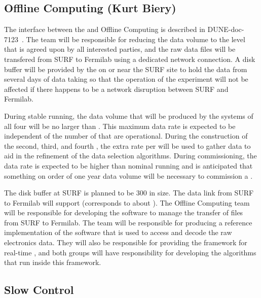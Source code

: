 \subsection{Offline Computing (Kurt Biery)}
\label{sec:fd-daq-intfc-fnal-cmptg}

The interface between the  and Offline Computing is
described in DUNE-doc-7123~\cite{docdb-7123}.
The  team will be responsible for reducing the data volume
to the level that is agreed upon by all interested parties, and the
raw data files will be transfered from SURF to Fermilab using a
dedicated network connection.
A disk buffer will be provided by the  on or near the SURF
site to hold the data from several days of data taking so that the
operation of the experiment will not be affected if there happens to
be a network disruption between SURF and Fermilab.

During stable running, the data volume that will be produced by the
 systems of all four  will be no larger
than \offsitepbpy.
This maximum data rate is expected to be independent of the number of
 that are operational.
During the construction of the second, third, and fourth
, the extra rate per  will be used
to gather data to aid in the refinement of the data selection
algorithms.
During commissioning, the data rate is expected to be higher than
nominal running and is anticipated that something on order of one year
data volume will be necessary to commission a .

The disk buffer at SURF is planned to be \SI{300}{\TB} in size.
The data link from SURF to Fermilab will support \surffnalbw
(\offsitepbpy corresponds to about \offsitegbps).
The Offline Computing team will be responsible for developing the
software to manage the transfer of files from SURF to Fermilab.
The  team will be responsible for producing a reference
implementation of the software that is used to access and decode the
raw electronics data.
They will also be responsible for providing the framework for
real-time , and both groups will have responsibility for
developing the  algorithms that run inside this framework.

\subsection{Slow Control}
\label{sec:fd-daq-intfc-sc}
\label{sec:fd-daq-intfc-sc}

